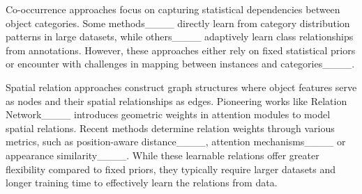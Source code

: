 Co-occurrence approaches focus on capturing statistical dependencies between object categories. Some methods____ directly learn from category distribution patterns in large datasets, while others____ adaptively learn class relationships from annotations. However, these approaches either rely on fixed statistical priors or encounter with challenges in mapping between instances and categories____.

Spatial relation approaches construct graph structures where object features serve as nodes and their spatial relationships as edges. Pioneering works like Relation Network____ introduces geometric weights in attention modules to model spatial relations. Recent methods determine relation weights through various metrics, such as position-aware distance____, attention mechanisms____ or appearance similarity____. While these learnable relations offer greater flexibility compared to fixed priors, they typically require larger datasets and longer training time to effectively learn the relations from data.